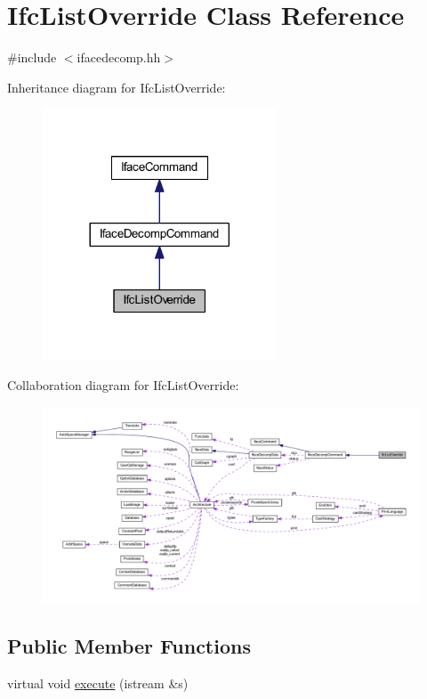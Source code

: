 \hypertarget{class_ifc_list_override}{}\section{Ifc\+List\+Override Class Reference}
\label{class_ifc_list_override}


{\ttfamily \#include $<$ifacedecomp.\+hh$>$}



Inheritance diagram for Ifc\+List\+Override\+:
\nopagebreak
\begin{figure}[H]
\begin{center}
\leavevmode
\includegraphics[width=197pt]{class_ifc_list_override__inherit__graph}
\end{center}
\end{figure}


Collaboration diagram for Ifc\+List\+Override\+:
\nopagebreak
\begin{figure}[H]
\begin{center}
\leavevmode
\includegraphics[width=350pt]{class_ifc_list_override__coll__graph}
\end{center}
\end{figure}
\subsection*{Public Member Functions}
\begin{DoxyCompactItemize}
\item 
virtual void \mbox{\hyperlink{class_ifc_list_override_a85d2e02d525c2a7ab57e54602078a2b9}{execute}} (istream \&s)
\end{DoxyCompactItemize}
